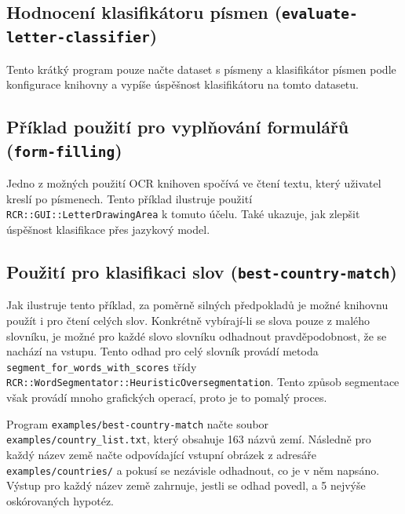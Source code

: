 \documentclass[a4paper]{article}
\begin{document}
\subsection{Hodnocení klasifikátoru písmen (\texttt{evaluate-letter-classifier})}
Tento krátký program pouze načte dataset s písmeny a klasifikátor písmen podle
konfigurace knihovny a vypíše úspěšnost klasifikátoru na tomto datasetu.

\subsection{Příklad použití pro vyplňování formulářů (\texttt{form-filling})}
Jedno z možných použití OCR knihoven spočívá ve čtení textu, který uživatel
kreslí po písmenech. Tento příklad ilustruje použití
\texttt{RCR::GUI::LetterDrawingArea} k tomuto účelu. Také ukazuje, jak zlepšit
úspěšnost klasifikace přes jazykový model.

\subsection{Použití pro klasifikaci slov (\texttt{best-country-match})}

Jak ilustruje tento příklad, za poměrně silných předpokladů je možné knihovnu
použít i pro čtení celých slov. Konkrétně vybírají-li se slova pouze z
malého slovníku, je možné pro každé slovo slovníku odhadnout pravděpodobnost,
že se nachází na vstupu. Tento odhad pro celý slovník provádí metoda
\texttt{segment\_for\_words\_with\_scores} třídy
\texttt{RCR::WordSegmentator::HeuristicOversegmentation}.
Tento způsob segmentace však provádí mnoho grafických operací, proto je to pomalý proces.

Program \texttt{examples/best-country-match} načte soubor
\texttt{examples/country\_list.txt}, který obsahuje 163 názvů zemí.
Následně pro každý název země načte odpovídající vstupní obrázek z adresáře
\texttt{examples/countries/} a pokusí se nezávisle odhadnout, co je v něm
napsáno. Výstup pro každý název země zahrnuje, jestli se odhad povedl, a
5 nejvýše oskórovaných hypotéz.
\end{document}
